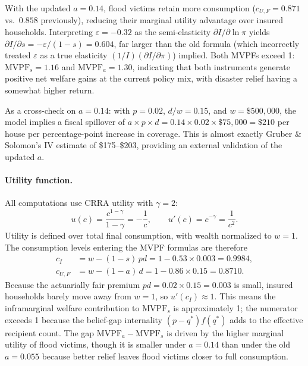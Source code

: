 \documentclass[12pt]{article}
\begin{document}
With the updated $a = 0.14$, flood victims retain more consumption ($c_{U,F} = 0.871$ vs.\ $0.858$ previously), reducing their marginal utility advantage over insured households. Interpreting $\varepsilon = -0.32$ as the semi-elasticity $\partial I/\partial\ln\pi$ yields $\partial I/\partial s = -\varepsilon/(1-s) = 0.604$, far larger than the old formula (which incorrectly treated $\varepsilon$ as a true elasticity $(1/I)(\partial I/\partial\pi)$) implied. Both MVPFs exceed 1: $\mathrm{MVPF}_s = 1.16$ and $\mathrm{MVPF}_a = 1.30$, indicating that both instruments generate positive net welfare gains at the current policy mix, with disaster relief having a somewhat higher return.

As a cross-check on $a = 0.14$: with $p = 0.02$, $d/w = 0.15$, and $w = \$500{,}000$, the model implies a fiscal spillover of $a \times p \times d = 0.14 \times 0.02 \times \$75{,}000 = \$210$ per house per percentage-point increase in coverage. This is almost exactly Gruber \& Solomon's IV estimate of \$175--\$203, providing an external validation of the updated $a$.

\paragraph{Utility function.}
All computations use CRRA utility with $\gamma = 2$:
\[
    u(c) = \frac{c^{1-\gamma}}{1-\gamma} = -\frac{1}{c}, \qquad u'(c) = c^{-\gamma} = \frac{1}{c^2}.
\]
Utility is defined over total final consumption, with wealth normalized to $w = 1$.
The consumption levels entering the MVPF formulas are therefore
\begin{align*}
    c_I     &= w - (1-s)\,pd = 1 - 0.53 \times 0.003 = 0.9984, \\
    c_{U,F} &= w - (1-a)\,d = 1 - 0.86 \times 0.15 = 0.8710.
\end{align*}
Because the actuarially fair premium $pd = 0.02 \times 0.15 = 0.003$ is small, insured households barely move away from $w = 1$, so $u'(c_I) \approx 1$.
This means the inframarginal welfare contribution to $\mathrm{MVPF}_s$ is approximately 1; the numerator exceeds 1 because the belief-gap internality $(p-q^*)f(q^*)$ adds to the effective recipient count.
The gap $\mathrm{MVPF}_a - \mathrm{MVPF}_s$ is driven by the higher marginal utility of flood victims, though it is smaller under $a = 0.14$ than under the old $a = 0.055$ because better relief leaves flood victims closer to full consumption.
\end{document}
